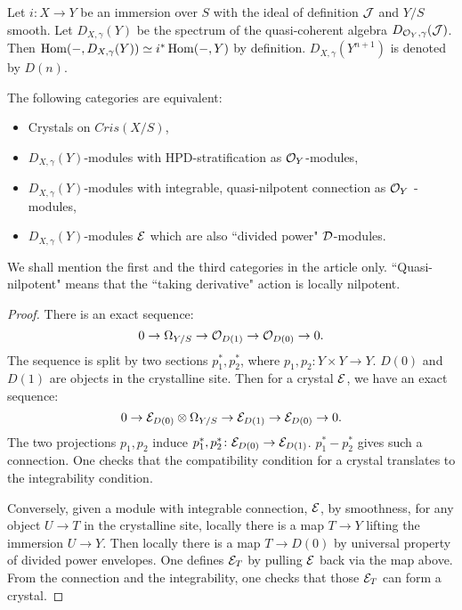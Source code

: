 Let $i \colon X \to Y$ be an immersion over $S$ 
with the ideal of definition ${\mathcal {J}}$ and $Y/S$ smooth. 
Let $D_{X,\gamma}(Y)$ be the spectrum of 
the quasi-coherent algebra $D_{{\mathcal {O}}_Y,\gamma}({\mathcal {J}})$. 
Then $\operatorname{Hom}(-,D_{X,\gamma}(Y)) \simeq i^*\operatorname{Hom}(-,Y)$ by definition. 
$D_{X,\gamma}(Y^{n+1})$ is denoted by $D(n)$. 

\begin{theorem}
    The following categories are equivalent:
    \begin{itemize}
        \item 
            Crystals on $Cris(X/S)$,
        \item 
            $D_{X,\gamma}(Y)$-modules with HPD-stratification as ${\mathcal {O}}_Y$-modules,
        \item 
            $D_{X,\gamma}(Y)$-modules with integrable, 
            quasi-nilpotent connection as ${\mathcal {O}}_Y$ -modules,
        \item 
            $D_{X,\gamma}(Y)$-modules ${\mathcal {E}}$ 
            which are also  ``divided power" ${\mathcal {D}}$-modules.
    \end{itemize}
    We shall mention the first and the third categories in the article only. 
    ``Quasi-nilpotent" means that 
    the ``taking derivative" action is locally nilpotent.
\end{theorem}

\begin{proof}
    There is an exact sequence:
    \[
        0 \to \Omega_{Y/S} \to {\mathcal {O}}_{D(1)} \to {\mathcal {O}}_{D(0)} \to 0.
    \]
    The sequence is split by two sections $p_1^*, p_2^*$, 
    where $p_1, p_2 \colon Y \times Y \to Y$. 
    $D(0)$ and $D(1)$ are objects in the crystalline site. 
    Then for a crystal ${\mathcal {E}}$, we have an exact sequence:
    \[
        0\to {\mathcal {E}}_{D(0)} \otimes \Omega_{Y/S} 
        \to {\mathcal {E}}_{D(1)} \to {\mathcal {E}}_{D(0)} \to 0.
    \]
    The two projections $p_1, p_2$ induce 
    $p_1^*, p_2^* \colon {\mathcal {E}}_{D(0)} \to {\mathcal {E}}_{D(1)}$. 
    $p_1^* - p_2^*$ gives such a connection. 
    One checks that the compatibility condition for a crystal 
    translates to the integrability condition. 
    
    Conversely, given a module with integrable connection, ${\mathcal {E}}$,
    by smoothness, for any object $U \to T$ in the crystalline site, 
    locally there is a map $T \to Y$ lifting the immersion $U \to Y$. 
    Then locally there is a map $T \to D(0)$ 
    by universal property of divided power envelopes. 
    One defines ${\mathcal {E}}_T$ by pulling ${\mathcal {E}}$ back via the map above. 
    From the connection and the integrability, 
    one checks that those ${\mathcal {E}}_T$ can form a crystal.
\end{proof}


